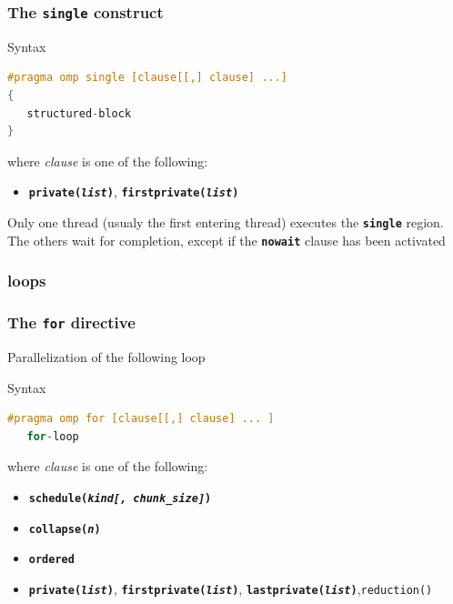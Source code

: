 \begin{frame}[containsverbatim]
\frametitle{The \texttt{single} construct}

\begin{exampleblock}{Syntax}
\begin{lstlisting}[language=C,frame=lines]
#pragma omp single [clause[[,] clause] ...]
{
   structured-block
}
\end{lstlisting}
where \textit{clause} is one of the following:
\begin{itemize}
\item{\textbf{\texttt{private(\textit{list})}}, \textbf{\texttt{firstprivate(\textit{list})}}}
\end{itemize}
\end{exampleblock}

\begin{block}{}
Only one thread (usualy the first entering thread) executes the \textbf{\texttt{single}} region. The others wait for completion, except if the \textbf{\texttt{nowait}} clause has been activated
\end{block}

\end{frame}





\subsubsection[Loops]{loops}

\begin{frame}[containsverbatim]
\frametitle{The \texttt{for} directive}

\begin{block}{}
Parallelization of the following loop
\end{block}

\begin{exampleblock}{Syntax}
\begin{lstlisting}[language=C,frame=lines]
#pragma omp for [clause[[,] clause] ... ]
   for-loop
\end{lstlisting}
where \textit{clause} is one of the following:
\begin{itemize}
\item{\textbf{\texttt{schedule(\textit{kind[, chunk\_size]})}}}
\item{\textbf{\texttt{collapse(\textit{n})}}}
\item{\textbf{\texttt{ordered}}}
\item{\textbf{\texttt{private(\textit{list})}}, \textbf{\texttt{firstprivate(\textit{list})}}, \textbf{\texttt{lastprivate(\textit{list})}},\texttt{reduction()} }
\end{itemize}
\end{exampleblock}
\end{frame}


